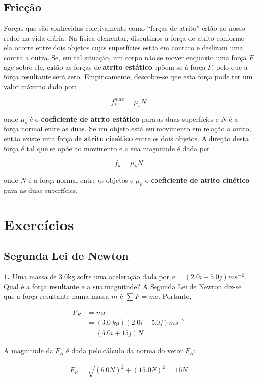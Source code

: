 \subsection{Fricção}
Forças que são conhecidas coletivamente como “forças de atrito” estão ao nosso redor na vida diária. Na física elementar, discutimos a força de atrito conforme ela ocorre entre dois objetos cujas
superfícies estão em contato e deslizam uma contra a outra. Se, em tal situação, um corpo não se mover enquanto uma força $F$ age sobre ele, então
as forças de \textbf{atrito estático} opõem-se à força $F$, pelo que a força resultante será zero. Empiricamente,
descobre-se que esta força pode ter um valor máximo dado por:

$$
f_s^{max}=\mu_sN
$$

onde $\mu_s$ é o \textbf{coeficiente de atrito estático} para as duas superfícies e $N$ é a força normal entre as duas.
Se um objeto está em movimento em relação a outro, então existe uma força de \textbf{atrito cinético} entre os dois objetos. A direção desta força é tal que se opõe ao movimento e a sua magnitude é dada por

$$
f_k=\mu_kN
$$

onde $N$ é a força normal entre os objetos e $\mu_k$ o \textbf{coeficiente de atrito cinético} para as duas superfícies.


\section{Exercícios}
\subsection{Segunda Lei de Newton}
\textbf{1.} Uma massa de 3.0kg sofre uma aceleração dada por $a=(2.0i + 5.0j)ms^{-2}$. Qual é a força resultante e a sua magnitude?
\linebreak
A Segunda Lei de Newton diz-se que a força resultante numa massa $m$ é $\sum F = ma$. Portanto,

$$
\begin{aligned}
    F_{R}&=ma \\
        &=(3.0\ kg)(2.0i+5.0j)ms^{-2} \\
        &=(6.0i + 15j)N
\end{aligned}
$$

A magnitude da $F_{R}$ é dada pelo cálculo da norma do vetor $F_{R}$:

$$
\begin{aligned}
    F_{R}=\sqrt{(6.0N)^2+(15.0N)^2}=16N
\end{aligned}
$$


